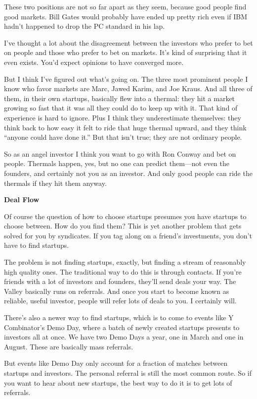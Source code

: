 These two positions are not so far apart as they seem, because good
people find good markets. Bill Gates would probably have ended up pretty
rich even if IBM hadn't happened to drop the PC standard in his lap.

I've thought a lot about the disagreement between the investors who
prefer to bet on people and those who prefer to bet on markets. It's
kind of surprising that it even exists. You'd expect opinions to have
converged more.

But I think I've figured out what's going on. The three most prominent
people I know who favor markets are Marc, Jawed Karim, and Joe Kraus.
And all three of them, in their own startups, basically flew into a
thermal: they hit a market growing so fast that it was all they could do
to keep up with it. That kind of experience is hard to ignore. Plus I
think they underestimate themselves: they think back to how easy it felt
to ride that huge thermal upward, and they think ``anyone could have
done it.'' But that isn't true; they are not ordinary people.

So as an angel investor I think you want to go with Ron Conway and bet
on people. Thermals happen, yes, but no one can predict them---not even
the founders, and certainly not you as an investor. And only good people
can ride the thermals if they hit them anyway.

\textbf{Deal Flow}

Of course the question of how to choose startups presumes you have
startups to choose between. How do you find them? This is yet another
problem that gets solved for you by syndicates. If you tag along on a
friend's investments, you don't have to find startups.

The problem is not finding startups, exactly, but finding a stream of
reasonably high quality ones. The traditional way to do this is through
contacts. If you're friends with a lot of investors and founders,
they'll send deals your way. The Valley basically runs on referrals. And
once you start to become known as reliable, useful investor, people will
refer lots of deals to you. I certainly will.

There's also a newer way to find startups, which is to come to events
like Y Combinator's Demo Day, where a batch of newly created startups
presents to investors all at once. We have two Demo Days a year, one in
March and one in August. These are basically mass referrals.

But events like Demo Day only account for a fraction of matches between
startups and investors. The personal referral is still the most common
route. So if you want to hear about new startups, the best way to do it
is to get lots of referrals.


